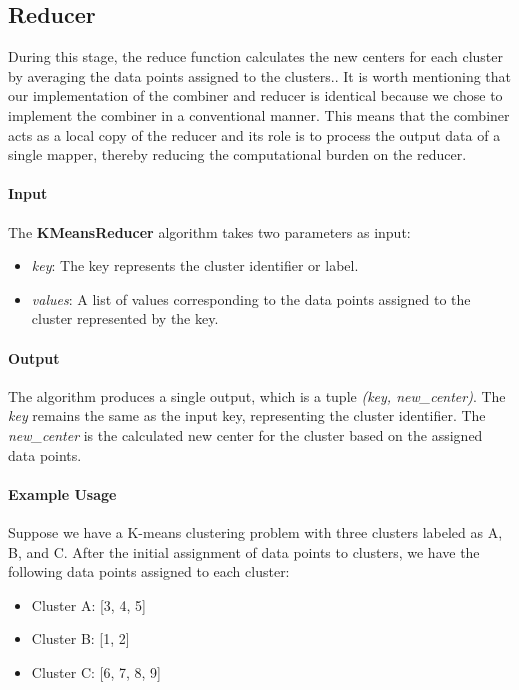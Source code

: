 \documentclass[parskip=full]{report}
\begin{document}
\subsection{Reducer}

During this stage, the reduce function calculates the new centers for each cluster by averaging the data points assigned to the clusters.. It is worth mentioning that our implementation of the combiner and reducer is identical because we chose to implement the combiner in a conventional manner. This means that the combiner acts as a local copy of the reducer and its role is to process the output data of a single mapper, thereby reducing the computational burden on the reducer.

\paragraph{Input}

The \textbf{KMeansReducer} algorithm takes two parameters as input:
\begin{itemize}
	\item \textit{key}: The key represents the cluster identifier or label.
	\item \textit{values}: A list of values corresponding to the data points assigned to the cluster represented by the key.
\end{itemize}

\paragraph{Output}

The algorithm produces a single output, which is a tuple \textit{(key, new\_center)}. The \textit{key} remains the same as the input key, representing the cluster identifier. The \textit{new\_center} is the calculated new center for the cluster based on the assigned data points.

\paragraph{Example Usage}

Suppose we have a K-means clustering problem with three clusters labeled as A, B, and C. After the initial assignment of data points to clusters, we have the following data points assigned to each cluster:

\begin{itemize}
	\item Cluster A: [3, 4, 5]
	\item Cluster B: [1, 2]
	\item Cluster C: [6, 7, 8, 9]
\end{itemize}
\end{document}

